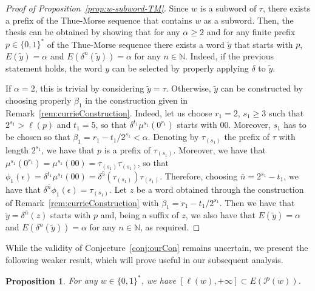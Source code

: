 \documentclass[12pt]{article}
\theoremstyle{plain}\newtheorem{teo}{Theorem}
\theoremstyle{plain}\newtheorem{proposition}[teo]{Proposition}
\theoremstyle{plain}\newtheorem{lemma}[teo]{Lemma}
\theoremstyle{plain}\newtheorem{corollary}[teo]{Corollary}
\theoremstyle{plain}\newtheorem{conjecture}[teo]{Conjecture}
\theoremstyle{definition}\newtheorem{definition}[teo]{Definition}
\theoremstyle{remark}\newtheorem{remark}[teo]{Remark}
\theoremstyle{definition}\newtheorem{example}[teo]{Example}
\numberwithin{teo}{section}
\numberwithin{equation}{section}
\begin{document}
\begin{proof}[Proof of Proposition~\ref{prop:w-subword-TM}]
	Since $w$ is a subword of $\tau$,
	there exists a prefix of the Thue-Morse sequence
	that contains $w$ as a subword.
	Then, the thesis can be obtained 
	by showing that for any $\alpha  \ge 2$ and
	for any finite prefix $p \in \{0,1\}^*$
	of the Thue-Morse sequence
	there exists a word $\tilde{y}$ that starts with $p$,
	$E(\tilde{y}) = \alpha$ and $E(\delta^n(\tilde{y})) = \alpha$
	for any $n \in \mathbb{N}$.
	Indeed, if the previous statement holds,
	the word $y$ can be selected by properly applying 
	$\delta$ to $\tilde{y}$.

	If $\alpha = 2$, this is trivial by considering 
	$\tilde{y} = \tau$.
	Otherwise, $\tilde{y}$ can be constructed 
	by choosing properly $\beta_1$
	in the construction given in Remark~\ref{rem:currieConstruction}.
	Indeed, let us choose $r_1 = 2$,
	$s_1 \ge 3$ such that $2^{s_1} > \ell(p)$
	and $t_1 = 5$,
	so that $\delta^{t_1}\mu^{s_1}(0^{r_1})$
	starts with $00$.
	Moreover, $s_1$ has to be chosen 
	so that $\beta_1 = r_1 - t_1/2^{s_1} < \alpha$.
	Denoting by $\tau_{(s_1)}$
	the prefix of $\tau$ with length $2^{s_1}$,
	we have that $p$ is a prefix of $\tau_{(s_1)}$.
	Moreover, we have that 
	$\mu^{s_1}(0^{r_1}) = \mu^{s_1}(00)
	= \tau_{(s_1)}\tau_{(s_1)}$,
	so that $\phi_1(\epsilon) = \delta^{t_1}\mu^{s_1}(00)
	=\delta^{5}(\tau_{(s_1)})\tau_{(s_1)}$.
	Therefore, choosing $\bar{n} = 2^{s_1} - t_1$,
	we have that 
	$\delta^{\bar{n}}\phi_1(\epsilon) = \tau_{(s_1)}$.
	Let $z$ be a word obtained through the construction 
	of Remark~\ref{rem:currieConstruction}
	with $\beta_1 = r_1 - t_1/2^{s_1}$.
	Then we have that 
	$\tilde{y} = \delta^{\bar{n}}(z)$
	starts with $p$ and,
	being a suffix of $z$, we also have
	that $E(\tilde{y}) = \alpha$
	and $E(\delta^n(\tilde{y})) = \alpha$ for any $n \in \mathbb{N}$,
	as required.
\end{proof}

 While the validity of Conjecture~\ref{conj:ourCon} remains uncertain,
we present the following weaker result,
which will prove useful in our subsequent analysis.

\begin{proposition}
	\label{prop:weakTheorem}
	For any $w\in \{0,1\}^*$,
	we have
	$[\ell(w),+\infty]\subset E(\mathcal{P}(w))$.
\end{proposition}
\end{document}
